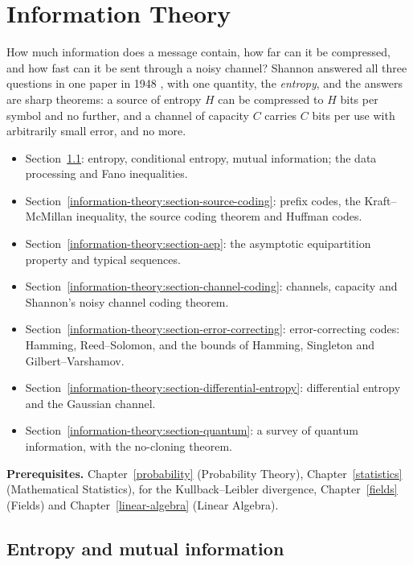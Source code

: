 \chapter{Information Theory}\label{information-theory}

How much information does a message contain, how far can it be compressed, and how fast can it be sent through a noisy channel? Shannon answered all three questions in one paper in 1948 \cite{shannon-1948}, with one
quantity, the \emph{entropy}, and the answers are sharp theorems: a source of entropy $H$ can be compressed to $H$ bits per symbol and no further, and a channel of capacity $C$ carries $C$ bits per use with arbitrarily small
error, and no more.
\begin{itemize}
\item Section~\ref{information-theory:section-entropy}: entropy, conditional entropy, mutual information; the data processing and Fano inequalities.
\item Section~\ref{information-theory:section-source-coding}: prefix codes, the Kraft--McMillan inequality, the source coding theorem and Huffman codes.
\item Section~\ref{information-theory:section-aep}: the asymptotic equipartition property and typical sequences.
\item Section~\ref{information-theory:section-channel-coding}: channels, capacity and Shannon's noisy channel coding theorem.
\item Section~\ref{information-theory:section-error-correcting}: error-correcting codes: Hamming, Reed--Solomon, and the bounds of Hamming, Singleton and Gilbert--Varshamov.
\item Section~\ref{information-theory:section-differential-entropy}: differential entropy and the Gaussian channel.
\item Section~\ref{information-theory:section-quantum}: a survey of quantum information, with the no-cloning theorem.
\end{itemize}

\noindent\textbf{Prerequisites.} Chapter~\ref{probability} (Probability Theory), Chapter~\ref{statistics} (Mathematical Statistics), for the Kullback--Leibler divergence, Chapter~\ref{fields} (Fields) and
Chapter~\ref{linear-algebra} (Linear Algebra).

\section{Entropy and mutual information}\label{information-theory:section-entropy}

